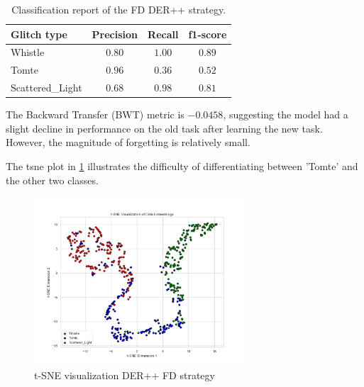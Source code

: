 \begin{table}[ht]
\centering
    \begin{tabular}{|l|c c c|}
    \hline
    \textbf{Glitch type} & \textbf{Precision} & \textbf{Recall} & \textbf{f1-score} \\ \hline
    Whistle & $0.80$ & $1.00$ & $0.89$ \\
    Tomte & $0.96$ & $0.36$ & $0.52$ \\
    Scattered\_Light & $0.68$ & $0.98$ & $0.81$ \\
    \hline
    \end{tabular}
    \caption{Classification report of the FD DER++ strategy.}
    \label{tbl:RQ2_class_report_FD_DER++}
\end{table}

The Backward Transfer (BWT) metric is $-0.0458$, suggesting the model had a slight decline in performance on the old task after learning the new task. However, the magnitude of forgetting is relatively small. 

The \acrshort{tsne} plot in \ref{fig:tsne_FD_DER++} illustrates the difficulty of differentiating between 'Tomte' and the other two classes. 

\begin{figure}[H]
    \centering
    \includegraphics[width=0.7\textwidth]{Grad Assignment/Images/tSNE_FractalDimension_DER++_test.png}
    \caption{t-SNE visualization DER++ FD strategy}
    \label{fig:tsne_FD_DER++}
\end{figure}


